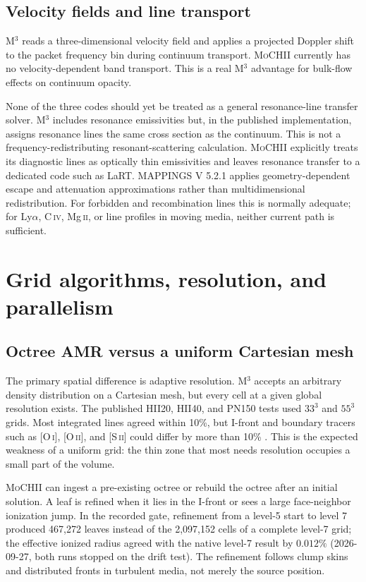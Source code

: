 \documentclass[english,a4paper]{my_memo}
\newcommand{\MoCHII}{\textsc{MoCHII}}
\newcommand{\Mthree}{M$^3$}
\newcommand{\Mappings}{MAPPINGS V 5.2.1}
\begin{document}
\subsection{Velocity fields and line transport}

\Mthree{} reads a three-dimensional velocity field and applies a projected
Doppler shift to the packet frequency bin during continuum transport.
\MoCHII{} currently has no velocity-dependent band transport.  This is a
real \Mthree{} advantage for bulk-flow effects on continuum opacity.

None of the three codes should yet be treated as a general resonance-line transfer
solver.  \Mthree{} includes resonance emissivities but, in the published
implementation, assigns resonance lines the same cross section as the
continuum.  This is not a frequency-redistributing resonant-scattering
calculation.  \MoCHII{} explicitly treats its diagnostic lines as optically
thin emissivities and leaves resonance transfer to a dedicated code such
as LaRT.  \Mappings{} applies geometry-dependent escape and attenuation
approximations rather than multidimensional redistribution.  For forbidden
and recombination lines this is normally adequate;
for Ly$\alpha$, C\,\textsc{iv}, Mg\,\textsc{ii}, or line profiles in moving
media, neither current path is sufficient.

\section{Grid algorithms, resolution, and parallelism}

\subsection{Octree AMR versus a uniform Cartesian mesh}

The primary spatial difference is adaptive resolution.  \Mthree{} accepts
an arbitrary density distribution on a Cartesian mesh, but every cell at a
given global resolution exists.  The published HII20, HII40, and PN150
tests used $33^3$ and $55^3$ grids.  Most integrated lines agreed within
10\%, but I-front and boundary tracers such as [O\,\textsc{i}],
[O\,\textsc{ii}], and [S\,\textsc{ii}] could differ by more than 10\%
\cite{jin2022}.  This is the expected weakness of a uniform grid: the
thin zone that most needs resolution occupies a small part of the volume.

\MoCHII{} can ingest a pre-existing octree or rebuild the octree after an
initial solution.  A leaf is refined when it lies in the I-front or sees a
large face-neighbor ionization jump.  In the recorded gate, refinement
from a level-5 start to level 7 produced 467,272 leaves instead of the
2,097,152 cells of a complete level-7 grid; the effective ionized radius
agreed with the native level-7 result by $0.012\%$ (2026-09-27, both runs stopped on the drift test).  The refinement follows
clump skins and distributed fronts in turbulent media, not merely the
source position.
\end{document}
